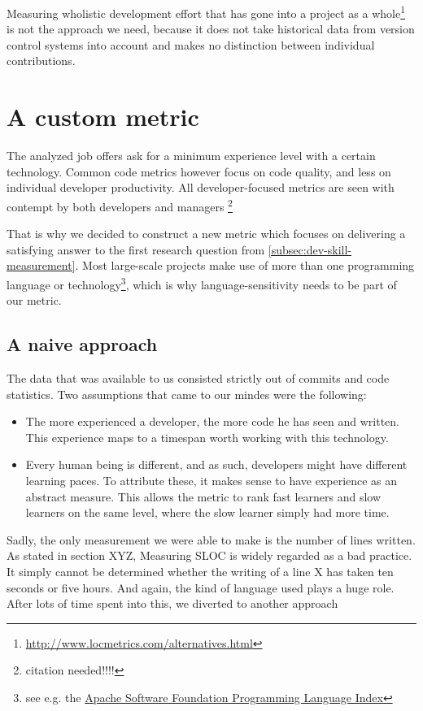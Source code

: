 Measuring wholistic development effort that has gone into a project as a
whole\footnote{\url{http://www.locmetrics.com/alternatives.html}}
is not the approach we need, because it does not take historical data from
version control systems into account and makes no distinction between
individual contributions.

\section{A custom metric}
The analyzed job offers ask for a minimum experience level with a certain technology.
Common code metrics however focus on code quality, and less on individual developer
productivity. All developer-focused metrics are seen with contempt
by both developers and managers \footnote{citation needed!!!!}
\newline

That is why we decided to construct a new metric which focuses on delivering a
satisfying answer to the first research question from \ref{subsec:dev-skill-measurement}.
Most large-scale projects make use of more than one programming language
or technology\footnote{see e.g. the \href{http://projects.apache.org/indexes/language.html}{Apache Software Foundation Programming Language Index}}, which is why language-sensitivity
needs to be part of our metric.

\subsection{A naive approach}
The data that was available to us consisted strictly out of commits and
code statistics. Two assumptions that came to our mindes were the following:

\begin{itemize}
 \item The more experienced a developer, the more code he has seen and written.
       This experience maps to a timespan worth working with this technology.
 \item Every human being is different, and as such, developers might have different learning paces.
       To attribute these, it makes sense to have experience as an abstract measure.
       This allows the metric to rank fast learners and slow learners on the same level,
       where the slow learner simply had more time.
\end{itemize}

Sadly, the only measurement we were able to make is the number of lines written.
As stated in section XYZ, Measuring SLOC is widely regarded as a bad practice.
It simply cannot be determined whether the writing of a line X has taken
ten seconds or five hours. And again, the kind of language used plays a huge role.
After lots of time spent into this, we diverted to another approach

